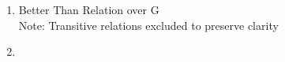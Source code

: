 \documentclass[12pt]{article}
\newenvironment{solution}[2][Solution]{ \begin{trivlist}
\item[\hskip \labelsep {\bfseries #1}]}{\end{trivlist}}
\begin{document}
\begin{solution}{7}
\item[]
\begin{enumerate}[label=\alph*)]
\item \begin{minipage}[t]{\linewidth}
          \raggedright
          Better Than Relation over G\\
           \footnotesize Note: Transitive relations excluded to preserve clarity
          \end{minipage}
\item 

\end{enumerate}
\end{solution}
\end{document}
